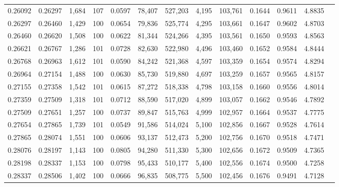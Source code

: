 \begin{tabular}{rrrrrrrrrrrrr}
0.26092 & 0.26297 & 1,684 & 107 &                                     0.0597 &  78,407 & 527,203 &   4,195 & 103,761 & 0.1644 & 0.9611 & 4.8835 \\
0.26297 & 0.26460 & 1,429 & 100 &                                     0.0654 &  79,836 & 525,774 &   4,295 & 103,661 & 0.1647 & 0.9602 & 4.8703 \\
0.26460 & 0.26620 & 1,508 & 100 &                                     0.0622 &  81,344 & 524,266 &   4,395 & 103,561 & 0.1650 & 0.9593 & 4.8563 \\
0.26621 & 0.26767 & 1,286 & 101 &                                     0.0728 &  82,630 & 522,980 &   4,496 & 103,460 & 0.1652 & 0.9584 & 4.8444 \\
0.26768 & 0.26963 & 1,612 & 101 &                                     0.0590 &  84,242 & 521,368 &   4,597 & 103,359 & 0.1654 & 0.9574 & 4.8294 \\
0.26964 & 0.27154 & 1,488 & 100 &                                     0.0630 &  85,730 & 519,880 &   4,697 & 103,259 & 0.1657 & 0.9565 & 4.8157 \\
0.27155 & 0.27358 & 1,542 & 101 &                                     0.0615 &  87,272 & 518,338 &   4,798 & 103,158 & 0.1660 & 0.9556 & 4.8014 \\
0.27359 & 0.27509 & 1,318 & 101 &                                     0.0712 &  88,590 & 517,020 &   4,899 & 103,057 & 0.1662 & 0.9546 & 4.7892 \\
0.27509 & 0.27651 & 1,257 & 100 &                                     0.0737 &  89,847 & 515,763 &   4,999 & 102,957 & 0.1664 & 0.9537 & 4.7775 \\
0.27654 & 0.27865 & 1,739 & 101 &                                     0.0549 &  91,586 & 514,024 &   5,100 & 102,856 & 0.1667 & 0.9528 & 4.7614 \\
0.27865 & 0.28074 & 1,551 & 100 &                                     0.0606 &  93,137 & 512,473 &   5,200 & 102,756 & 0.1670 & 0.9518 & 4.7471 \\
0.28076 & 0.28197 & 1,143 & 100 &                                     0.0805 &  94,280 & 511,330 &   5,300 & 102,656 & 0.1672 & 0.9509 & 4.7365 \\
0.28198 & 0.28337 & 1,153 & 100 &                                     0.0798 &  95,433 & 510,177 &   5,400 & 102,556 & 0.1674 & 0.9500 & 4.7258 \\
0.28337 & 0.28506 & 1,402 & 100 &                                     0.0666 &  96,835 & 508,775 &   5,500 & 102,456 & 0.1676 & 0.9491 & 4.7128 \\

\end{tabular}
